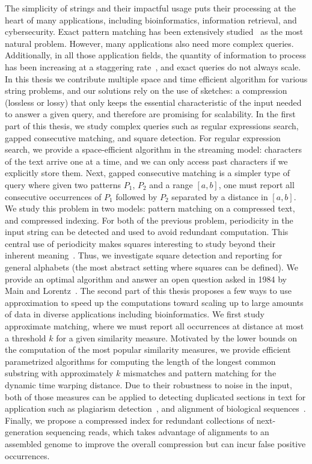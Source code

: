 The simplicity of strings and their impactful usage puts their processing at the heart of many applications, including bioinformatics, information retrieval, and cybersecurity. Exact pattern matching has been extensively studied~\cite{charras2004handbook} as the most natural problem. However, many applications also need more complex queries. Additionally, in all those application fields, the quantity of information to process has been increasing at a staggering rate~\cite{muir2016real}, and exact queries do not always scale.
In this thesis we contribute multiple space and time efficient algorithm for various string problems, and our solutions rely on the use of sketches: a compression (lossless or lossy) that only keeps the essential characteristic of the input needed to answer a given query, and therefore are promising for scalability.
In the first part of this thesis, we study complex queries such as regular expressions search, gapped consecutive matching, and square detection. 
For regular expression search, we provide a space-efficient algorithm in the streaming model: characters of the text arrive one at a time, and we can only access past characters if we explicitly store them. 
Next, gapped consecutive matching is a simpler type of query where given two patterns $P_1$, $P_2$ and a range $[a,b]$, one must report all consecutive occurrences of $P_1$ followed by $P_2$ separated by a distance in $[a,b]$. We study this problem in two models: pattern matching on a compressed text, and compressed indexing.
For both of the previous problem, periodicity in the input string can be detected and used to avoid redundant computation. This central use of periodicity makes squares interesting to study beyond their inherent meaning~\cite{Kolpakov2003}. Thus, we investigate square detection and reporting for general alphabets (the most abstract setting where squares can be defined). We provide an optimal algorithm and answer an open question asked in 1984 by Main and Lorentz~\cite{Main1984}.
%
The second part of this thesis proposes a few ways to use approximation to speed up the computations toward scaling up to large amounts of data in diverse applications including bioinformatics.
We first study approximate matching, where we must report all occurrences at distance at most a threshold $k$ for a given similarity measure. Motivated by the lower bounds on the computation of the most popular similarity measures, we provide efficient parametrized algorithms for computing the length of the longest common substring with approximately $k$ mismatches and pattern matching for the dynamic time warping distance.
Due to their robustness to noise in the input, both of those measures can be applied to detecting duplicated sections in text for application such as plagiarism detection~\cite{zou2010cluster}, and alignment of biological sequences~\cite{leimeister2014kmacs,loose2016real,han2018accurate}.
Finally, we propose a compressed index for redundant collections of next-generation sequencing reads, which takes advantage of alignments to an assembled genome to improve the overall compression but can incur false positive occurrences.

